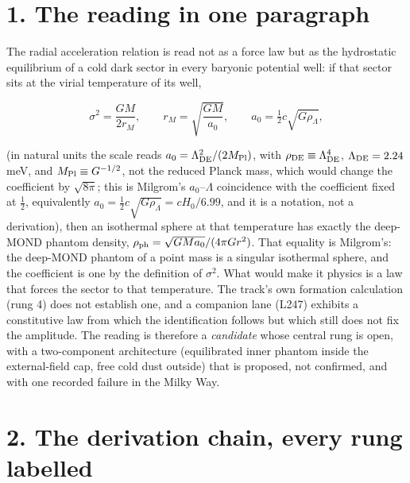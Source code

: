 \documentclass[
  11pt,
]{article}
\begin{document}
\section{1. The reading in one
paragraph}\label{the-reading-in-one-paragraph}

The radial acceleration relation is read not as a force law but as the
hydrostatic equilibrium of a cold dark sector in every baryonic
potential well: if that sector sits at the virial temperature of its
well,

\[\sigma^2 = \frac{G M}{2 r_M}, \qquad r_M = \sqrt{\frac{G M}{a_0}}, \qquad a_0 = \tfrac12 c\sqrt{G\rho_\Lambda},\]

(in natural units the scale reads
\(a_0 = \Lambda_{\rm DE}^2/(2M_{\rm Pl})\), with
\(\rho_{\rm DE} \equiv \Lambda_{\rm DE}^4\), \(\Lambda_{\rm DE} = 2.24\)
meV, and \(M_{\rm Pl} \equiv G^{-1/2}\), not the reduced Planck mass,
which would change the coefficient by \(\sqrt{8\pi}\); this is Milgrom's
\(a_0\)--\(\Lambda\) coincidence with the coefficient fixed at
\(\tfrac12\), equivalently
\(a_0 = \tfrac12 c\sqrt{G\rho_\Lambda} = cH_0/6.99\), and it is a
notation, not a derivation), then an isothermal sphere at that
temperature has exactly the deep-MOND phantom density,
\(\rho_{\rm ph} = \sqrt{GMa_0}/(4\pi G r^2)\). That equality is
Milgrom's: the deep-MOND phantom of a point mass is a singular
isothermal sphere, and the coefficient is one by the definition of
\(\sigma^2\). What would make it physics is a law that forces the sector
to that temperature. The track's own formation calculation (rung 4) does
not establish one, and a companion lane (L247) exhibits a constitutive
law from which the identification follows but which still does not fix
the amplitude. The reading is therefore a \emph{candidate} whose central
rung is open, with a two-component architecture (equilibrated inner
phantom inside the external-field cap, free cold dust outside) that is
proposed, not confirmed, and with one recorded failure in the Milky Way.

\section{2. The derivation chain, every rung
labelled}\label{the-derivation-chain-every-rung-labelled}
\end{document}
